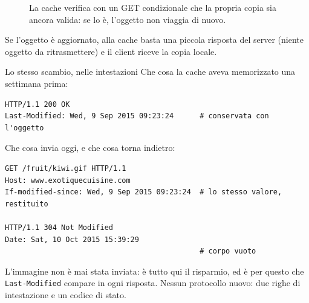\begin{figure}[H]
\centering
{}
\caption{La cache verifica con un GET condizionale che la propria copia sia ancora valida: se lo è, l'oggetto non viaggia di nuovo.}
\end{figure}

Se l'oggetto è aggiornato, alla cache basta una piccola risposta del server (niente oggetto da
ritrasmettere) e il client riceve la copia locale.

\begin{esempio}{Lo stesso scambio, nelle intestazioni}
Che cosa la cache aveva memorizzato una settimana prima:
\begin{lstlisting}[language=http]
HTTP/1.1 200 OK
Last-Modified: Wed, 9 Sep 2015 09:23:24      # conservata con l'oggetto
\end{lstlisting}
Che cosa invia oggi, e che cosa torna indietro:
\begin{lstlisting}[language=http]
GET /fruit/kiwi.gif HTTP/1.1
Host: www.exotiquecuisine.com
If-modified-since: Wed, 9 Sep 2015 09:23:24  # lo stesso valore, restituito

HTTP/1.1 304 Not Modified
Date: Sat, 10 Oct 2015 15:39:29
                                             # corpo vuoto
\end{lstlisting}
L'immagine non è mai stata inviata: è tutto qui il risparmio, ed è per questo che \texttt{Last-Modified} compare
in ogni risposta. Nessun protocollo nuovo: due righe di intestazione e un codice di stato.
\end{esempio}

